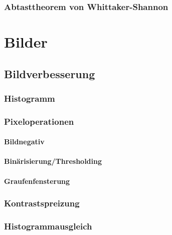 \documentclass[a4paper, 11pt, accentcolor = tud3b]{tudreport}
\begin{document}
			\subsection{Abtasttheorem von Whittaker-Shannon} %

	\chapter{Bilder} %

		\section{Bildverbesserung} %

			\subsection{Histogramm} %

			\subsection{Pixeloperationen} %

				\subsubsection{Bildnegativ} %

				\subsubsection{Binärisierung/Thresholding} %

				\subsubsection{Graufenfensterung} %

			\subsection{Kontrastspreizung} %

			\subsection{Histogrammausgleich} %
\end{document}
